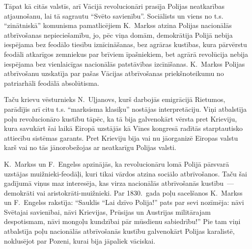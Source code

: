 \documentclass[twoside,a5paper,12pt,fleqn,openany]{extbook}
\begin{document}
Tāpat kā citās valstīs, arī Vācijā revolucionāri prasīja Polijas neatkarības atjaunošanu, lai tā sagrautu ``Svēto savienību''. Sociālists un viens no t.s. ``zinātniskā'' komunisma pamatlicējiem K.~Markss atzina Polijas nacionālās atbrīvošanas nepieciešamību, jo, pēc viņa domām, demokrātija Polijā nebija iespējama bez feodālo tiesību iznīcināšanas, bez agrāras kustības, kura pārvērstu feodāli atkarīgos zemniekus par brīviem īpašniekiem, bet agrārā revolūcija nebija iespējama bez vienlaicīgas nacionālās patstāvības izcīnīšanas. K.~Markss Polijas atbrīvošanu uzskatīja par pašas Vācijas atbrīvošanas priekšnoteikumu no patriarhāli feodālā absolūtisma.

Taču krievu vēsturnieks N.~Uļjanovs, kurš darbojās emigrācijā Rietumos, parādījis arī citu t.s. ``marksisma klasiķu'' nostājas interpretāciju. Viņi atbalstīja poļu revolucionāro kustību tāpēc, ka tā bija galvenokārt vērsta pret Krieviju, kura savukārt šai laikā Eiropā uzstājās kā Vīnes kongresā radītās starptautisko attiecību sistēmas garants. Pret Krieviju bija vai nu jāorganizē Eiropas valstu karš vai no tās jānorobežojas ar neatkarīgu Polijas valsti.

K.~Markss un F.~Engelss apzinājās, ka revolucionāru lomā Polijā pārsvarā uzstājas muižnieki-feodāļi, kuri tikai vārdos atzina sociālo atbrīvošanos. Taču šai gadījumā viņus maz interesēja, kas virza nacionālās atbrīvošanās kustību~--- demokrāti vai aristokrāti-muižnieki. Par 1830.~gada poļu sacelšanos K.~Markss un F.~Engelss rakstīja: ``Sauklis ``Lai dzīvo Polija!'' pats par sevi nozīmēja: nāvi Svētajai savienībai, nāvi Krievijas, Prūsijas un Austrijas militārajam despotismam, nāvi mongoļu kundzībai pār mūsdienu sabiedrību!'' Pie tam viņi atbalstīja poļu nacionālās atbrīvošanās kustību galvenokārt Polijas karalistē, noklusējot par Pozeni, kurai bija jāpaliek vāciskai.
\end{document}
